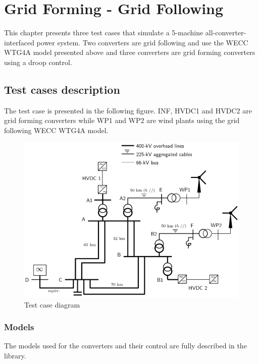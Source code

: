 \documentclass[a4paper, 12pt]{report}
\begin{document}
\newpage

\chapter{Grid Forming - Grid Following}

This chapter presents three test cases that simulate a 5-machine all-converter-interfaced power system.
Two converters are grid following and use the WECC WTG4A model presented above and three converters are grid forming converters using a droop control.

\section{Test cases description}

\par The test case is presented in the following figure. INF, HVDC1 and HVDC2 are grid forming converters while WP1 and WP2 are wind plants using the grid following WECC WTG4A model.

\begin{figure}[H]
  \includegraphics[width=\textwidth]{GFMGFL.png}
  \caption{Test case diagram}
\end{figure}

\subsection{Models}

\par The models used for the converters and their control are fully described in the \Dynawo library.
\end{document}

